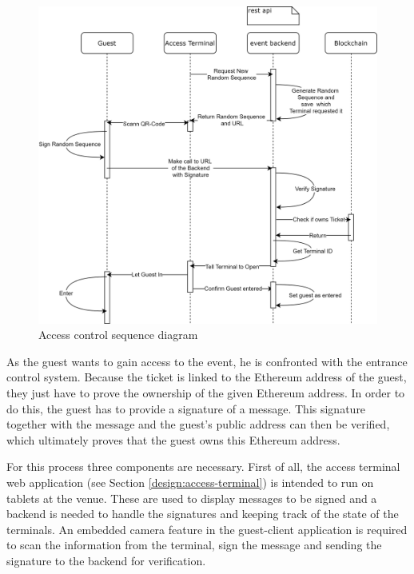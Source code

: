 \begin{figure}[H]
    \centering
    \includegraphics[width=16cm]{design/diagrams/AcessControl.png}
    \caption{Access control sequence diagram}
    \label{fig:access-controll}
\end{figure}

As the guest wants to gain access to the event, he is confronted with the entrance control system. Because the ticket is linked to the Ethereum address of the guest, they just have to prove the ownership of the given Ethereum address. In order to do this, the guest has to provide a signature of a message. This signature together with the message and the guest's public address can then be verified, which ultimately proves that the guest owns this Ethereum address.

For this process three components are necessary. First of all, the access terminal web application (see Section \ref{design:access-terminal}) is intended to run on tablets at the venue. These are used to display messages to be signed and a backend is needed to handle the signatures and keeping track of the state of the terminals. An embedded camera feature in the guest-client application is required to scan the information from the terminal, sign the message and sending the signature to the backend for verification.


